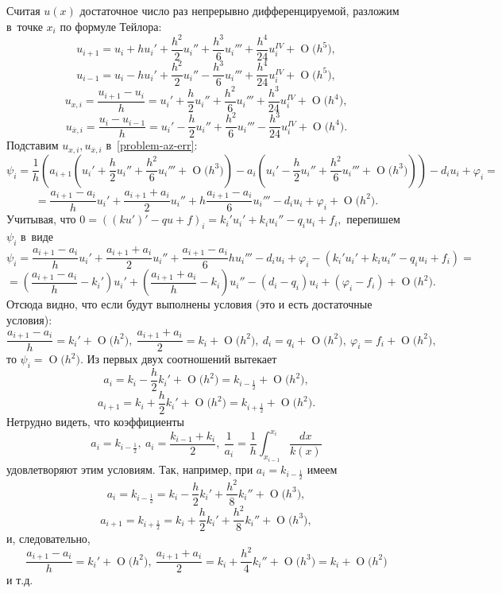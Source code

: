 \documentclass[11pt,a4paper,twoside,listtotoc,bibtotoc]{report}
\numberwithin{equation}{section}
\theoremstyle{definition}
\theoremstyle{plain}
\newcommand{\bigO}[1]{\ensuremath{\operatorname{O}\bigl(#1\bigr)}}
\begin{document}
Считая $u(x)$ достаточное число раз непрерывно дифференцируемой, разложим в~точке
$x_i$ по формуле Тейлора:
%
$$
    u_{i+1}=u_i+hu_i'+\frac{h^2}{2}u_i''+\frac{h^3}{6}u_i'''
    +\frac{h^4}{24}u_i^{IV}+\bigO{h^5},
$$
%
%
$$
    u_{i-1}=u_i-hu_i'+\frac{h^2}{2}u_i''-\frac{h^3}{6}u_i'''
    +\frac{h^4}{24}u_i^{IV}+\bigO{h^5},
$$
%
%
$$
    u_{x,i}=\frac{u_{i+1}-u_i}{h}=u_i'+\frac{h}{2}u_i''+\frac{h^2}{6}u_i'''+
    \frac{h^3}{24}u_i^{IV}+\bigO{h^4},
$$
%
%
$$
    u_{\overline{x},i}=\frac{u_{i}-u_{i-1}}{h}=u_i'-\frac{h}{2}u_i''+\frac{h^2}{6}u_i'''-
    \frac{h^3}{24}u_i^{IV}+\bigO{h^4}.
$$
%
Подставим $u_{x,i},u_{\overline{x},i}$ в~\eqref{problem-az-err}:
%
$$
    \psi_i=\frac{1}{h}\left(a_{i+1}\left(u_i'+\frac{h}{2}u_i''
    +\frac{h^2}{6}u_i'''+\bigO{h^3}\right)-a_i\left(u_i'-\frac{h}{2}u_i''
    +\frac{h^2}{6}u_i'''+\bigO{h^3}\right)\right) - d_iu_i + \varphi_i=
$$
%
%
$$
    =\frac{a_{i+1}-a_i}{h}u_i'+\frac{a_{i+1}+a_i}{2}u_i''+h\frac{a_{i+1}-a_i}{6}u_i'''
    -d_iu_i + \varphi_i +\bigO{h^2}.
$$
%
Учитывая, что
%
$
    0 = \left((ku')'-qu+f\right)_i=k_i'u_i'+k_iu_i''-q_iu_i+f_i,
$
%
перепишем $\psi_i$ в~виде
%
$$
    \psi_i=\frac{a_{i+1}-a_i}{h}u_i'+\frac{a_{i+1}+a_i}{2}u_i''
    +\frac{a_{i+1}-a_i}{6}hu_i'''-d_iu_i+\varphi_i-\left(k_i'u_i'
    +k_iu_i''-q_iu_i+f_i\right)=
$$
%
%
$$
    =\left(\frac{a_{i+1}-a_i}{h}-k_i'\right)u_i'
    +\left(\frac{a_{i+1}+a_i}{h}-k_i\right)u_i''
    -(d_i-q_i)u_i+(\varphi_i-f_i)+\bigO{h^2}.
$$
%
Отсюда видно, что если будут выполнены условия (это и есть достаточные условия):
%
\begin{equation}
    \label{condition-az-err}
    \frac{a_{i+1}-a_i}{h}=k_i'+\bigO{h^2},~\frac{a_{i+1}+a_i}{2}=k_i+\bigO{h^2},
    ~d_i=q_i+\bigO{h^2},~\varphi_i=f_i+\bigO{h^2},
\end{equation}
%
то $\psi_i=\bigO{h^2}$.
Из первых двух соотношений вытекает
%
$$
    a_i=k_i-\frac{h}{2}k_i'+\bigO{h^2}=k_{i-\frac 12}+\bigO{h^2},
$$
%
%
$$
    a_{i+1}=k_i+\frac{h}{2}k_i'+\bigO{h^2}=k_{i+\frac 12}+\bigO{h^2}.
$$
%
Нетрудно видеть, что коэффициенты
%
$$
    a_i=k_{i-\frac 12},~a_i=\frac{k_{i-1}+k_i}{2},~\frac{1}{a_i}=\frac{1}{h}
    \int_{x_{i-1}}^{x_i}\frac{dx}{k(x)}
$$
%
удовлетворяют этим условиям. Так, например, при $a_i=k_{i-\frac 12}$ имеем
%
$$
    a_i=k_{i-\frac 12} = k_i - \frac h2 k_i'+\frac{h^2}{8}k_i''+\bigO{h^3},
$$
%
%
$$
    a_{i+1}=k_{i+\frac 12}=k_i + \frac h2 k_i'+\frac{h^2}{8}k_i''+\bigO{h^3},
$$
%
и, следовательно,
%
$$
    \frac{a_{i+1}-a_i}{h}=k_i'+\bigO{h^2},~\frac{a_{i+1}+a_i}{2}=k_i
    +\frac{h^2}{4}k_i''+\bigO{h^3}=k_i+\bigO{h^2}
$$
%
и т.д.
\end{document}
